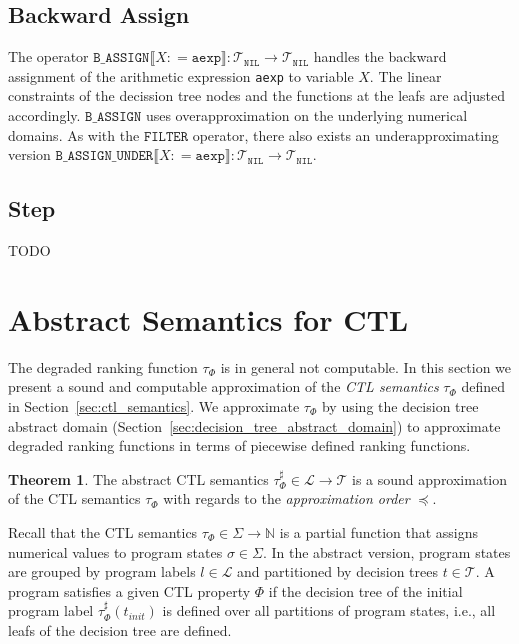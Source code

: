 \documentclass[11pt,a4paper,titlepage]{article}
\theoremstyle{definition}
\newtheorem{theorem}{Theorem}[section]
\begin{document}
\subsection{Backward Assign}\label{sec:tree_bwd_assign}
The operator $\mathtt{B\_ASSIGN}\llbracket X \colon = \mathtt{aexp} \rrbracket \colon \mathcal{T}_\mathtt{NIL} \rightarrow \mathcal{T}_\mathtt{NIL}$ handles
the backward assignment of the arithmetic expression \texttt{aexp} to variable $X$. The linear constraints of the decission tree nodes and the 
functions at the leafs are adjusted accordingly. $\mathtt{B\_ASSIGN}$ uses overapproximation on the underlying numerical domains. 
As with the $\mathtt{FILTER}$ operator, there also exists an underapproximating version 
$\mathtt{B\_ASSIGN\_UNDER}\llbracket X \colon = \mathtt{aexp} \rrbracket \colon \mathcal{T}_\mathtt{NIL} \rightarrow \mathcal{T}_\mathtt{NIL}$.

\subsection{Step}\label{sec:tree_step}
TODO





\pagebreak

\section{Abstract Semantics for CTL}\label{sec:abstract_ctl_semantics}

The degraded ranking function $\tau_\Phi$ is in general not computable. 
In this section we present a sound and computable approximation of the \textit{CTL semantics} $\tau_\Phi$ defined in Section~\ref{sec:ctl_semantics}.
We approximate $\tau_\Phi$ by using the decision tree abstract domain (Section~\ref{sec:decision_tree_abstract_domain}) 
to approximate degraded ranking functions in terms of piecewise defined ranking functions.

\begin{theorem}\label{thr:abstract_ctl_semantics}
    The abstract CTL semantics $\tau^{\sharp}_\Phi \in \mathcal{L} \rightarrow \mathcal{T}$ is a sound approximation of the
    CTL semantics $\tau_\Phi$ with regards to the \textit{approximation order} $\preceq$.
\end{theorem}

Recall that the CTL semantics $\tau_\Phi \in \Sigma \rightarrow \mathbb{N}$ is a partial function that 
assigns numerical values to program states $\sigma \in \Sigma$. 
In the abstract version, program states are grouped by program labels $l \in \mathcal{L}$ and
partitioned by decision trees $t \in \mathcal{T}$. 
A program satisfies a given CTL property $\Phi$ if the decision tree of the
initial program label $\tau^{\sharp}_\Phi(t_{init})$ is defined over all partitions of program states, i.e., 
all leafs of the decision tree are defined.\\
\end{document}
